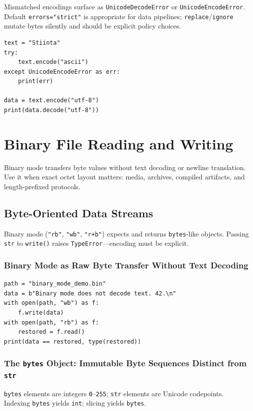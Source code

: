 \documentclass[a4paper,twoside]{report}
\begin{document}
Mismatched encodings surface as \texttt{UnicodeDecodeError} or \texttt{UnicodeEncodeError}. Default \texttt{errors="strict"} is appropriate for data pipelines; \texttt{replace}/\texttt{ignore} mutate bytes silently and should be explicit policy choices.

\begin{verbatim}
text = "Stiinta"
try:
    text.encode("ascii")
except UnicodeEncodeError as err:
    print(err)

data = text.encode("utf-8")
print(data.decode("utf-8"))
\end{verbatim}


\section{Binary File Reading and Writing}

Binary mode transfers byte values without text decoding or newline translation. Use it when exact octet layout matters: media, archives, compiled artifacts, and length-prefixed protocols.


\subsection{Byte-Oriented Data Streams}

Binary mode (\texttt{"rb"}, \texttt{"wb"}, \texttt{"r+b"}) expects and returns \texttt{bytes}-like objects. Passing \texttt{str} to \texttt{write()} raises \texttt{TypeError}---encoding must be explicit.

\subsubsection{Binary Mode as Raw Byte Transfer Without Text Decoding}

\begin{verbatim}
path = "binary_mode_demo.bin"
data = b"Binary mode does not decode text. 42.\n"
with open(path, "wb") as f:
    f.write(data)
with open(path, "rb") as f:
    restored = f.read()
print(data == restored, type(restored))
\end{verbatim}

\subsubsection{The \texttt{bytes} Object: Immutable Byte Sequences Distinct from \texttt{str}}

\texttt{bytes} elements are integers \texttt{0}--\texttt{255}; \texttt{str} elements are Unicode codepoints. Indexing \texttt{bytes} yields \texttt{int}; slicing yields \texttt{bytes}.
\end{document}
